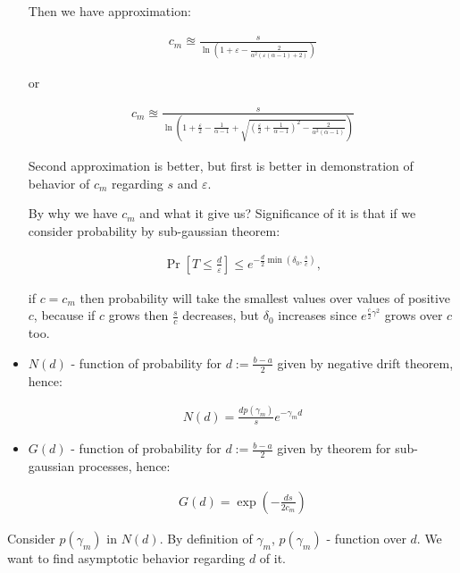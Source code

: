 \documentclass[12pt, a4paper]{article}
\theoremstyle{remark}
\theoremstyle{definition}
\begin{document}
\begin{itemize}
    Then we have approximation:

    \begin{gather*}
        c_m \approxeq \frac{s}{\ln\left(1 + \varepsilon - \frac{2}{\alpha^2(\varepsilon(\alpha - 1) + 2)}\right)}
    \end{gather*}
    
    or 

    \begin{gather*}
        c_m \approxeq \frac{s}{\ln\left(1 + \frac{\varepsilon}{2} - \frac{1}{\alpha - 1} + \sqrt{\left(\frac{\varepsilon}{2} + \frac{1}{\alpha - 1}\right)^2 - \frac{2}{\alpha^2(\alpha - 1)}}\right)}
    \end{gather*}

    Second approximation is better, but first is better in demonstration of behavior of 
    \(c_m\) regarding \(s\) and \(\varepsilon\).

    By why we have \(c_m\) and what it give us? Significance of it is that if we consider probability by sub-gaussian theorem:

    \begin{align*}
        \Pr \left[T \leq \frac{d}{\varepsilon}\right] \leq e^{- \frac{d}{2} \min\left(\delta_0, \frac{s}{c}\right)},
    \end{align*}

    if \(c = c_m\) then probability will take the smallest values over values of positive \(c\), because if \(c\) grows then \(\frac{s}{c}\) decreases, but \(\delta_0\) increases since \( e^{\frac{c}{2} \gamma^2}\) grows over \(c\) too.

    \item \(N(d)\) - function of probability for \(d:= \frac{b - a}{2}\) given by negative drift theorem, hence:
    
    \begin{align*}
        N(d) = \frac{d p(\gamma_m)}{s}  e^{-\gamma_m d}
    \end{align*}

    \item \(G(d)\) - function of probability for \(d:= \frac{b - a}{2}\) given by theorem for sub-gaussian processes, hence:
    
    \begin{align*}
        G(d) = \exp \left(-\frac{d s}{2 c_m}\right)
    \end{align*}
\end{itemize}

Consider \(p(\gamma_m)\) in \(N(d)\). By definition of \(\gamma_m\),  \(p(\gamma_m)\) - function over \(d\). We want to find asymptotic behavior regarding \(d\) of it.
\end{document}
